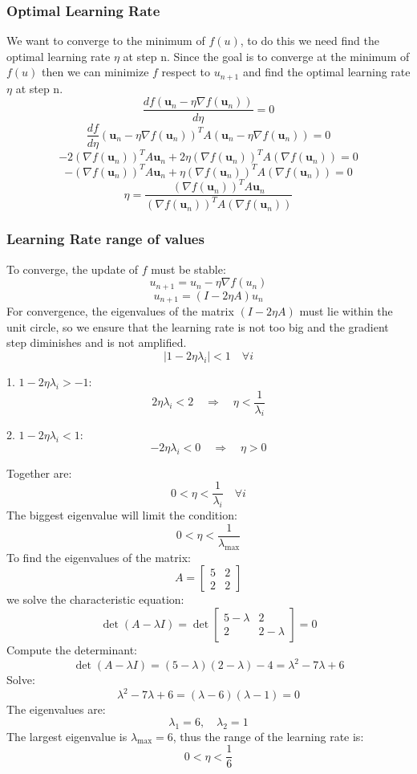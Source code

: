 \documentclass[a4paper,12pt]{article}
\begin{document}
\subsubsection{Optimal Learning Rate}
We want to converge to the minimum of $f(u)$, to do this we need find the optimal learning rate $\eta$ at step n. Since the goal is to converge at the minimum of $f(u)$ then we can minimize $f$ respect to $u_{n+1}$ and find the optimal learning rate $\eta$ at step n.
$$
\frac{d f(\mathbf{u}_n - \eta \nabla f(\mathbf{u}_n))}{d \eta} = 0
$$
$$
\frac{df}{d\eta}(\mathbf{u}_n - \eta \nabla f(\mathbf{u}_n))^T A (\mathbf{u}_n - \eta \nabla f(\mathbf{u}_n)) = 0
$$
$$
-2 (\nabla f(\mathbf{u}_n))^T A \mathbf{u}_n + 2\eta (\nabla f(\mathbf{u}_n))^T A (\nabla f(\mathbf{u}_n)) = 0
$$
$$
- (\nabla f(\mathbf{u}_n))^T A \mathbf{u}_n + \eta (\nabla f(\mathbf{u}_n))^T A (\nabla f(\mathbf{u}_n)) = 0
$$
$$
\eta = \frac{(\nabla f(\mathbf{u}_n))^T A \mathbf{u}_n}{(\nabla f(\mathbf{u}_n))^T A (\nabla f(\mathbf{u}_n))}
$$
\subsubsection{Learning Rate range of values}

To converge, the update of $f$ must be stable:
$$
u_{n+1} = u_n - \eta \nabla f(u_n)
$$
$$
u_{n+1} = (I - 2\eta A) u_n
$$
For convergence, the eigenvalues of the matrix \( (I - 2\eta A) \) must lie within the unit circle, so we ensure that the learning rate is not too big and the gradient step diminishes and is not amplified.
$$
|1 - 2\eta \lambda_i| < 1 \quad \forall i
$$

1. \( 1 - 2\eta \lambda_i > -1 \):
$$
2\eta \lambda_i < 2 \quad \Rightarrow \quad \eta < \frac{1}{\lambda_i}
$$

2. \( 1 - 2\eta \lambda_i < 1 \):
$$
-2\eta \lambda_i < 0 \quad \Rightarrow \quad \eta > 0
$$

Together are:
$$
0 < \eta < \frac{1}{\lambda_i} \quad \forall i
$$
The biggest eigenvalue will limit the condition:
$$
0 < \eta < \frac{1}{\lambda_{\max}}
$$
To find the eigenvalues of the matrix:
$$
A = \begin{bmatrix} 5 & 2 \\ 2 & 2 \end{bmatrix}
$$
we solve the characteristic equation:
$$
\det(A - \lambda I) = \det\begin{bmatrix} 5 - \lambda & 2 \\ 2 & 2 - \lambda \end{bmatrix} = 0
$$
Compute the determinant:
$$
\det(A - \lambda I) = (5 - \lambda)(2 - \lambda) - 4 = \lambda^2 - 7\lambda + 6
$$
Solve:
$$
\lambda^2 - 7\lambda + 6 = (\lambda - 6)(\lambda - 1) = 0
$$
The eigenvalues are:
$$
\lambda_1 = 6, \quad \lambda_2 = 1
$$
The largest eigenvalue is \( \lambda_{\max} = 6 \), thus the range of the learning rate is:
$$
0 < \eta < \frac{1}{6}
$$
\end{document}
